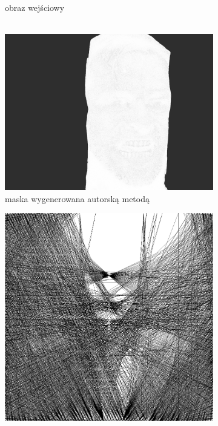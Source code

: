 \begin{figure}[H]
\begin{subfigure}{0.275\textwidth}
            \caption{obraz wejściowy\\\hphantom{ }\\\hphantom{ }}
            \label{comp-comp-joker-shining-c}
        \end{subfigure}
        \begin{subfigure}{0.275\textwidth}
            \centering
            \includegraphics[width = \textwidth]{img/6-comp/shining_mask_c20_inv0_bg10_obj1_ed1.png}
            \caption{maska wygenerowana autorską metodą}
            \label{comp-comp-joker-shining-d}
        \end{subfigure}
        \begin{subfigure}{0.195\textwidth}
            \centering
            \includegraphics[width = \textwidth]{img/6-comp/joker_r_i2000_c20_inv0_bg10_obj5_ed5.png}

\end{subfigure}
\end{figure}
